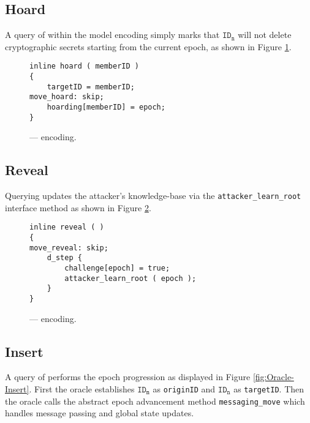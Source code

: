 \hypertarget{sec:hoard}{%
\subsection{Hoard}\label{sec:hoard}}

A query of  within the  model encoding simply marks that \(\mathtt{ID_n}\) will not delete cryptographic secrets starting from the current epoch, as shown in Figure \ref{fig:Oracle-Hoard}.

\begin{figure}[h!]
  \centering
  \caption{\label{fig:Oracle-Hoard}\CGKAmod{}{}{} ---  encoding.}
\begin{verbatim}
inline hoard ( memberID )
{
    targetID = memberID;
move_hoard: skip;
    hoarding[memberID] = epoch;
}
\end{verbatim}
\end{figure}


\hypertarget{reveal}{%
\subsection{Reveal}\label{reveal}}

Querying  updates the attacker's knowledge-base via the \texttt{attacker\_learn\_root} interface method as shown in Figure \ref{fig:Oracle-Reveal}.

\begin{figure}[h!]
  \centering
  \caption{\label{fig:Oracle-Reveal}\CGKAmod{}{}{} ---  encoding.}
\begin{verbatim}
inline reveal ( )
{
move_reveal: skip;
    d_step {
        challenge[epoch] = true;
        attacker_learn_root ( epoch );
    }
}
\end{verbatim}
\end{figure}


\hypertarget{sec:insert}{%
\subsection{Insert}\label{sec:insert}}

A query of  performs the epoch progression as displayed in Figure \ref{fig:Oracle-Insert}.
First the oracle establishes \(\mathtt{ID_m}\) as \texttt{originID} and \(\mathtt{ID_n}\) as \texttt{targetID}.
Then the oracle calls the abstract epoch advancement method \texttt{messaging\_move} which handles message passing and global state updates.


